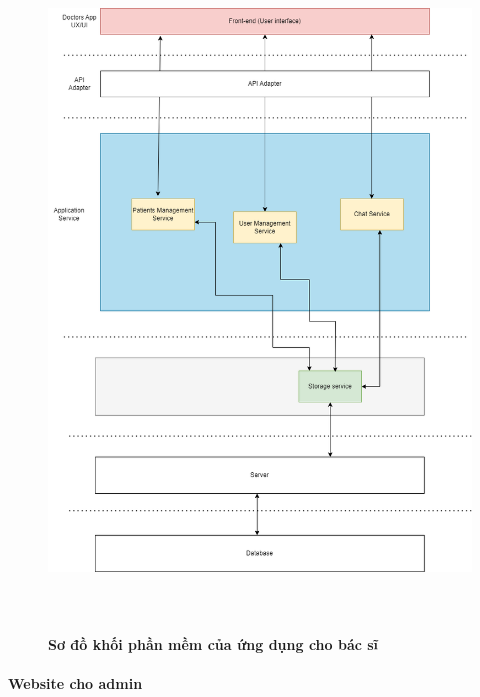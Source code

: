 \begin{figure}[H]
  \centering
  \includegraphics[width=16cm,height=18cm]{Images/system/fmECG_architecture-Doctors.drawio.png}
  \caption[Sơ đồ khối phần mềm của ứng dụng cho bác sĩ]{\bfseries \fontsize{12pt}{0pt}\selectfont Sơ đồ khối phần mềm của ứng dụng cho bác sĩ}
  \label{fmECG_architecture-Doctors} %
\end{figure}


\paragraph{Website cho admin}
\mbox{}

